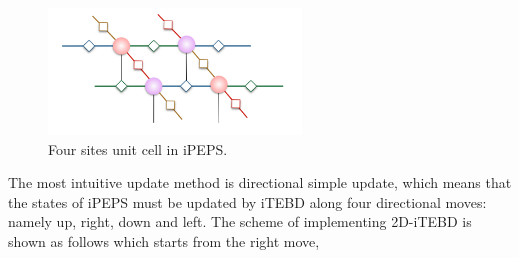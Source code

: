 \begin{figure}[ht]

	\centering
	\includegraphics[width=0.6\textwidth]{figures/fig314.png}
	\caption[The tensor diagrams of 2-D lattice]{Four sites unit cell in iPEPS.}
	\label{fig315}
\end{figure}

The most intuitive update method is directional simple update, which means that the states of iPEPS must be updated by iTEBD along four directional moves: namely up, right, down and left. The scheme of implementing 2D-iTEBD is shown as follows which starts from the right move,

